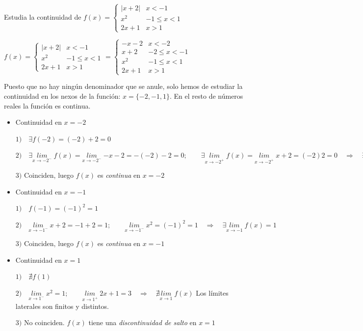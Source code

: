 	
	\begin{ejre} Estudia la continuidad de $f(x)=\left\{ \begin{matrix} 
	|x+2| & x<-1 \\ 
	x^2 & -1\le x < 1 \\
	2x+1 & x>1 
	\end{matrix} \right. $	
	\end{ejre}

	\begin{proofw}\renewcommand{\qedsymbol}{$\diamond$}
	
	$f(x)=\left\{ \begin{matrix} 
	|x+2| & x<-1 \\ 
	x^2 & -1\le x < 1 \\
	2x+1 & x>1 
	\end{matrix} \right. = 
	\left\{ \begin{matrix} 
	-x-2 & x<-2 \\
	x+2 & -2\le x<-1 \\ 
	x^2 & -1\le x < 1 \\
	2x+1 & x>1 
	\end{matrix} \right.$

		Puesto que no hay ningún denominador que se anule, solo hemos de estudiar la continuidad en los nexos de la función: $x=\{-2, -1, 1 \}$. En el resto de números reales la función es continua.
		
		\begin{itemize}
			\item Continuidad en $x=-2$
			
			$1) \quad \exists f(-2)=(-2)+2=0$
			
			$2) \quad \exists \underset{x\to -2^-}{lim}\;{f(x)}= \underset{x\to -2^-}{lim}\;{-x-2}=-(-2)-2=0;\qquad \exists \underset{x\to -2^+}{lim}\;{f(x)}= \underset{x\to -2^+}{lim}\;{x+2}=(-2)2=0 \quad \Rightarrow \quad \exists \underset{x\to -2}{lim}\;{f(x)}=0$
			
			$3) $ Coinciden, luego $f(x)$ es \emph{continua} en $x=-2$
			
			\item Continuidad en $x=-1$ 
			
			$1)\quad f(-1)=(-1)^2=1$
			
			$2) \quad \underset {x\to -1^-}{lim}\; {x+2}=-1+2=1; \qquad \underset {x\to -1^-}{lim}\; {x^2}=(-1)^2=1 \quad \Rightarrow \quad \exists \underset{x\to -1}{lim}\;{f(x)}=1$
			
			$3) $ Coinciden, luego $f(x)$ es \emph{continua} en $x=-1$
			
			\item Continuidad en $x=1$
			
			$1)\quad \nexists f(1)$
			
			$2) \quad \underset {x\to 1^-}{lim}\; {x^2}=1; \qquad \underset {x\to 1^+}{lim}\; {2x+1}=3 \quad \Rightarrow \quad \nexists \underset{x\to 1}{lim}\;{f(x)}$ Los límites laterales son finitos y distintos.
			
			$3) $ No coinciden. $f(x)$ tiene una \emph{discontinuidad de salto} en $x=1$
			
			
		\end{itemize}
		
	
	\end{proofw}
	
